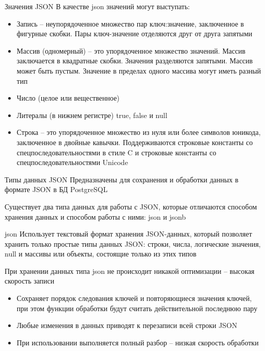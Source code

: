 \documentclass[12pt]{article}
\begin{document}
\begin{nota}{Значения JSON}
    В качестве json значений могут выступать:

    \begin{itemize}
        \item Запись -- неупорядоченное множество пар ключ:значение, заключенное в фигурные скобки. Пары ключ-значение отделяются друг от друга запятыми
        \item Массив (одномерный) -- это упорядоченное множество значений. Массив заключается в квадратные скобки. Значения разделяются запятыми. Массив может быть пустым. Значение в пределах одного массива могут иметь разный тип 
        \item Число (целое или вещественное)
        \item Литералы (в нижнем регистре) true, false и null 
        \item Строка -- это упорядоченное множество из нуля или более символов юникода, заключенное в двойные кавычки. Поддерживаются строковые константы со спецпоследовательностями в стиле C и строковые константы со спецпоследовательностями Unicode 
    \end{itemize}
\end{nota}

\begin{nota}{Типы данных JSON}
    Предназначены для сохранения и обработки данных в формате JSON в БД PostgreSQL

    Существует два типа данных для работы с JSON, которые отличаются способом хранения данных и способом работы с ними: json и jsonb 
\end{nota}

\begin{Remark}{json}
    Использует текстовый формат хранения JSON-данных, который позволяет хранить только простые типы данных JSON: строки, числа, логические значения, null и массивы или объекты, состоящие только из этих типов

    При хранении данных типа json не происходит никакой оптимизации -- высокая скорость записи 

    \begin{itemize}
        \item Сохраняет порядок следования ключей и повторяющиеся значения ключей, при этом функции обработки будут считать действительной последнюю пару 
        \item Любые изменения в данных приводят к перезаписи всей строки JSON 
        \item При использовании выполняется полный разбор -- низкая скорость обработки 
    \end{itemize}
\end{Remark}
\end{document}
